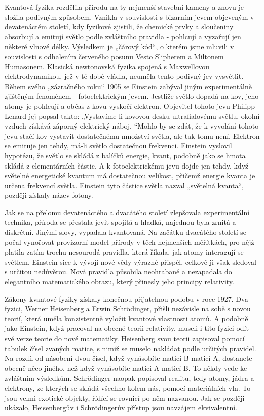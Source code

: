   Kvantová fyzika rozdělila přírodu na ty nejmenší stavební kameny a znovu je složila podivným
  způsobem. Vznikla v souvislosti s bizarním jevem objeveným v devatenáctém století, kdy fyzikové
  zjistili, že chemické prvky a sloučeniny absorbují a emitují světlo podle zvláštního pravidla -
  pohlcují a vyzařují jen některé vlnové délky. Výsledkem je „čárový kód“, o kterém jsme mluvili v
  souvislosti s odhalením červeného posunu Vesto Slipherem a Miltonem Humasonem. Klasická
  newtonovská fyzika spojená s Maxwellovou elektrodynamikou, jež v té době vládla, neuměla tento
  podivný jev vysvětlit. Během svého „zázračného roku“ 1905 se Einstein zabýval jiným experimentálně
  zjištěným fenoménem - fotoelektrickým jevem. Jestliže světlo dopadá na kov, jeho atomy je pohlcují
  a občas z kovu vyskočí elektron. Objevitel tohoto jevu Philipp Lenard jej popsal takto:
  „Vystavíme-li kovovou desku ultrafialovému světlu, okolní vzduch získává záporný elektrický náboj.
  “Mohlo by se zdát, že k vyvolání tohoto jevu stačí kov vystavit dostatečnému množství světla, ale
  tak tomu není. Elektron se emituje jen tehdy, má-li světlo dostatečnou frekvenci. Einstein
  vyslovil hypotézu, že světlo se skládá z balíčků energie, kvant, podobně jako se hmota skládá z
  elementárních částic. A k fotoelektrickému jevu dojde jen tehdy, když světelné energetické kvantum
  má dostatečnou velikost, přičemž energie kvanta je určena frekvencí světla. Einstein tyto částice
  světla nazval „světelná kvanta“, později získaly název fotony. 
  
  Jak se na přelomu devatenáctého a dvacátého století zlepšovala experimentální technika, příroda se
  přestala jevit spojitá a hladká, najednou byla zrnitá a diskrétní. Jinými slovy, vypadala
  kvantovaná. Na začátku dvacátého století se počal vynořovat provizorní model přírody v těch
  nejmenších měřítkách, pro nějž platila zatím trochu nesourodá pravidla, která říkala, jak atomy
  interagují se světlem. Einstein sice k vývoji nové vědy výrazně přispěl, celkově ji však sledoval
  s určitou nedůvěrou. Nová pravidla působila neohrabaně a nezapadala do elegantního matematického
  obrazu, který přinesly jeho principy relativity. 
  
  Zákony kvantové fyziky získaly konečnou přijatelnou podobu v roce 1927. Dva fyzici, Werner
  Heisenberg a Erwin Schrödinger, přišli nezávisle na sobě s novou teorií, která uměla konzistentně
  vyložit kvantové vlastnosti atomů. A podobně jako Einstein, když pracoval na obecné teorii
  relativity, museli i tito fyzici odít své verze teorie do nové matematiky. Heisenberg svou teorii
  zapisoval pomocí tabulek čísel zvaných matice, s nimiž se muselo nakládat podle určitých pravidel.
  Na rozdíl od násobení dvou čísel, když vynásobíte matici B maticí A, dostanete obecně něco jiného,
  než když vynásobíte matici A maticí B. To někdy vede ke zvláštním výsledkům. Schrödinger naopak
  popisoval realitu, tedy atomy, jádra a elektrony, ze kterých se skládá všechno kolem nás, pomocí
  materiálních vln. To jsou velmi exotické objekty, řídící se rovnicí po něm nazvanou. Jak se
  později ukázalo, Heisenbergův i Schrödingerův přístup jsou navzájem ekvivalentní. 
  
